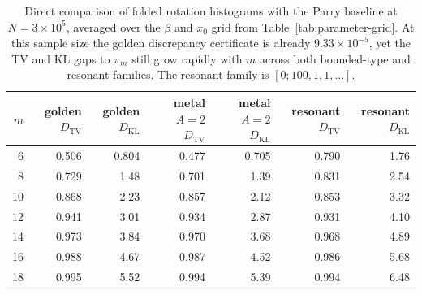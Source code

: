 \begin{table}[H]
\centering
\scriptsize
\setlength{\tabcolsep}{4pt}
\caption{Direct comparison of folded rotation histograms with the Parry
baseline at \(N=3\times 10^5\), averaged over the \(\beta\) and \(x_0\) grid
from Table~\ref{tab:parameter-grid}. At this sample size the golden
discrepancy certificate is already \(9.33\times 10^{-5}\), yet the TV and KL
gaps to \(\pi_m\) still grow rapidly with \(m\) across both bounded-type and
resonant families. The resonant family is \([0;100,1,1,\dots]\).}
\label{tab:rotation-parry-gap-summary}
\begin{tabular}{rrrrrrr}
\toprule
\(m\) & golden \(D_{\mathrm{TV}}\) & golden \(D_{\mathrm{KL}}\) & metal \(A=2\) \(D_{\mathrm{TV}}\) & metal \(A=2\) \(D_{\mathrm{KL}}\) & resonant \(D_{\mathrm{TV}}\) & resonant \(D_{\mathrm{KL}}\)\\
\midrule
6  & 0.506 & 0.804 & 0.477 & 0.705 & 0.790 & 1.76\\
8  & 0.729 & 1.48  & 0.701 & 1.39  & 0.831 & 2.54\\
10 & 0.868 & 2.23  & 0.857 & 2.12  & 0.853 & 3.32\\
12 & 0.941 & 3.01  & 0.934 & 2.87  & 0.931 & 4.10\\
14 & 0.973 & 3.84  & 0.970 & 3.68  & 0.968 & 4.89\\
16 & 0.988 & 4.67  & 0.987 & 4.52  & 0.986 & 5.68\\
18 & 0.995 & 5.52  & 0.994 & 5.39  & 0.994 & 6.48\\
\bottomrule
\end{tabular}
\end{table}
